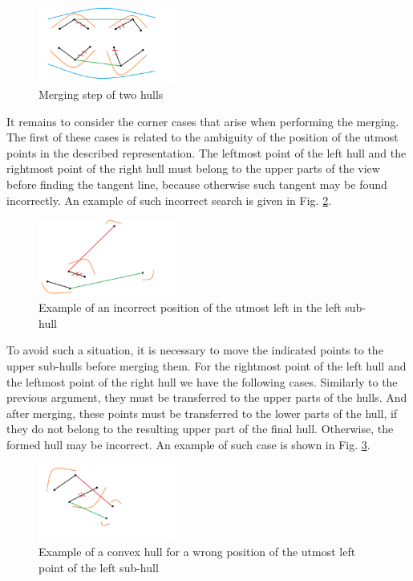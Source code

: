 \documentclass[conference]{IEEEtran}
\begin{document}
	\begin{figure}[t]
		\centering
		\includegraphics[width=0.4\textwidth, height=0.2\textheight]{ch_union}
		\caption{Merging step of two hulls}
		\label{fig:ch_union}
	\end{figure}
	
	It remains to consider the corner cases that arise when performing the merging. The first of these cases is related to the ambiguity of the position of the utmost points in the described representation. The leftmost point of the left hull and the rightmost point of the right hull must belong to the upper parts of the view before finding the tangent line, because otherwise such tangent may be found incorrectly. An example of such incorrect search is given in Fig. \ref{fig:incorect_search}.
	
	\begin{figure}[t]
		\centering
		\includegraphics[width=0.4\textwidth, height=0.2\textheight]{incorect_search}
		\caption{Example of an incorrect position of the utmost left in the left sub-hull}
		\label{fig:incorect_search}
	\end{figure}
	
	To avoid such a situation, it is necessary to move the indicated points to the upper sub-hulls before merging them. For the rightmost point of the left hull and the leftmost point of the right hull we have the following cases. Similarly to the previous argument, they must be transferred to the upper parts of the hulls. And after merging, these points must be transferred to the lower parts of the hull, if they do not belong to the resulting upper part of the final hull. Otherwise, the formed hull may be incorrect. An example of such case is shown in Fig. \ref{fig:incorect_edge_points}.
	
	
	\begin{figure}[t]
		\centering
		\includegraphics[width=0.4\textwidth, height=0.2\textheight]{incorect_edge_points}
		\caption{Example of a convex hull for a wrong position of the utmost left point of the left sub-hull}
		\label{fig:incorect_edge_points}
	\end{figure}
	
\end{document}
